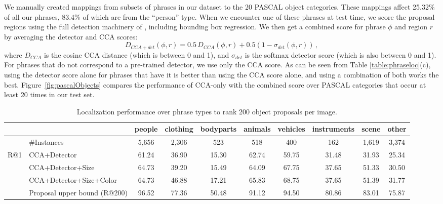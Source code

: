 \documentclass[twocolumn]{svjour3}
\begin{document}
We manually created mappings from subsets of phrases in our dataset to the 20 PASCAL object categories. These mappings affect 25.32\% of all our phrases, 83.4\% of which are from the ``person'' type. When we encounter one of these phrases at test time, we score the proposal regions using the full detection machinery of \cite{girshickICCV15fastrcnn}, including bounding box regression. We then get a combined score for phrase $\phi$ and region $r$ by averaging the detector and CCA scores:
\begin{equation}
D_{CCA+det}(\phi,r) = 0.5\,D_{CCA}(\phi,r) + 0.5(1-\sigma_{det}(\phi,r)) \,,
\end{equation}
where $D_{CCA}$ is the cosine CCA distance (which is between 0 and 1), and $\sigma_{det}$ is the softmax detector score (which is also between 0 and 1).
For phrases that do not correspond to a pre-trained detector, we use only the CCA score. As can be seen from Table \ref{table:phraseloc}(c), using the detector score alone for phrases that have it is better than using the CCA score alone, and using a combination of both works the best. Figure~\ref{fig:pascalObjects} compares the performance of CCA-only with the combined score over PASCAL categories that occur at least 20 times in our test set.  


\begin{table*}[t]
\begin{center}
\begin{tabular}{|ll|c|c|c|c|c|c|c|c|}
\hline
& & people &  clothing & bodyparts & animals & vehicles  & instruments & scene & other \\
\hline
\hline
& \#Instances & { 5,656 }  & { 2,306 } & { 523 } & { 518 } & { 400 }  & { 162 } & { 1,619 } & { 3,374 }\\
\hline
R@1 & CCA+Detector & { 61.24 } & { 36.90 } & { 15.30} & { 62.74 } & { 59.75 } & { 31.48 } & { 31.93 } & { 25.34 }\\
& CCA+Detector+Size & { 64.73 } & { 39.20 } & { 15.49 } & { 64.09 } & { 67.75 } & { 37.65 } & { 51.33 } & { 30.50 }\\
& CCA+Detector+Size+Color & { 64.73 } & { 46.88 } & { 17.21 } & { 65.83 } & { 68.75 } & { 37.65 } & { 51.39 } & { 31.77 }\\
\hline
& Proposal upper bound (R@200) & { 96.52 } & { 77.36 } & { 50.48 } & { 91.12 } & { 94.50 } & { 80.86 } & { 83.01 } & { 75.87 }\\
\hline
\end{tabular}
\caption{Localization performance over phrase types to rank 200 object proposals per image.}
\label{table:phraseLocBreakdown}
\end{center}
\end{table*}
\end{document}
